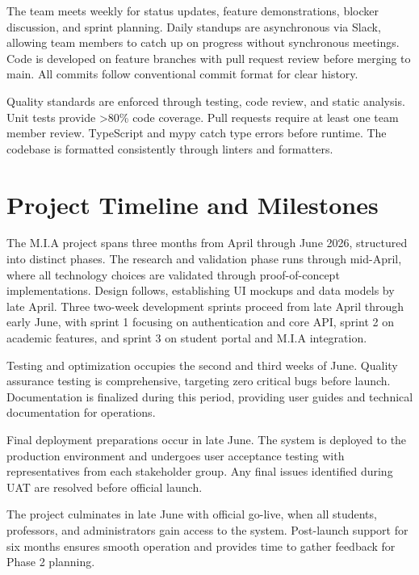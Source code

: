 \documentclass[12pt,a4paper]{report}
\begin{document}
The team meets weekly for status updates, feature demonstrations, blocker discussion, and sprint planning. Daily standups are asynchronous via Slack, allowing team members to catch up on progress without synchronous meetings. Code is developed on feature branches with pull request review before merging to main. All commits follow conventional commit format for clear history.

Quality standards are enforced through testing, code review, and static analysis. Unit tests provide >80\% code coverage. Pull requests require at least one team member review. TypeScript and mypy catch type errors before runtime. The codebase is formatted consistently through linters and formatters.

\chapter{Project Timeline and Milestones}

The M.I.A project spans three months from April through June 2026, structured into distinct phases. The research and validation phase runs through mid-April, where all technology choices are validated through proof-of-concept implementations. Design follows, establishing UI mockups and data models by late April. Three two-week development sprints proceed from late April through early June, with sprint 1 focusing on authentication and core API, sprint 2 on academic features, and sprint 3 on student portal and M.I.A integration.

Testing and optimization occupies the second and third weeks of June. Quality assurance testing is comprehensive, targeting zero critical bugs before launch. Documentation is finalized during this period, providing user guides and technical documentation for operations.

Final deployment preparations occur in late June. The system is deployed to the production environment and undergoes user acceptance testing with representatives from each stakeholder group. Any final issues identified during UAT are resolved before official launch.

The project culminates in late June with official go-live, when all students, professors, and administrators gain access to the system. Post-launch support for six months ensures smooth operation and provides time to gather feedback for Phase 2 planning.
\end{document}
